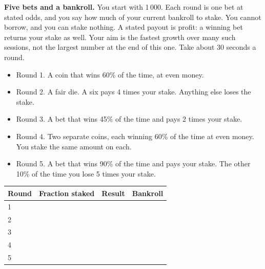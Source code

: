 \begin{question}\label{iq:iv2:played-games:4}
\textbf{Five bets and a bankroll.} You start with 1\,000. Each round is one bet at stated odds, and you say how much of your current bankroll to stake. You cannot borrow, and you can stake nothing. A stated payout is profit: a winning bet returns your stake as well. Your aim is the fastest growth over many such sessions, not the largest number at the end of this one. Take about 30 seconds a round.
\begin{itemize}
\item Round 1. A coin that wins 60\% of the time, at even money.
\item Round 2. A fair die. A six pays 4 times your stake. Anything else loses the stake.
\item Round 3. A bet that wins 45\% of the time and pays 2 times your stake.
\item Round 4. Two separate coins, each winning 60\% of the time at even money. You stake the same amount on each.
\item Round 5. A bet that wins 90\% of the time and pays your stake. The other 10\% of the time you lose 5 times your stake.
\end{itemize}

\medskip
\begin{tabular}{@{}l|l|l|l@{}}
Round & Fraction staked & Result & Bankroll \\ \hline
1 & & & \\[8pt]\hline
2 & & & \\[8pt]\hline
3 & & & \\[8pt]\hline
4 & & & \\[8pt]\hline
5 & & & \\[8pt]\hline
\end{tabular}
\end{question}
\vfill\clearpage

